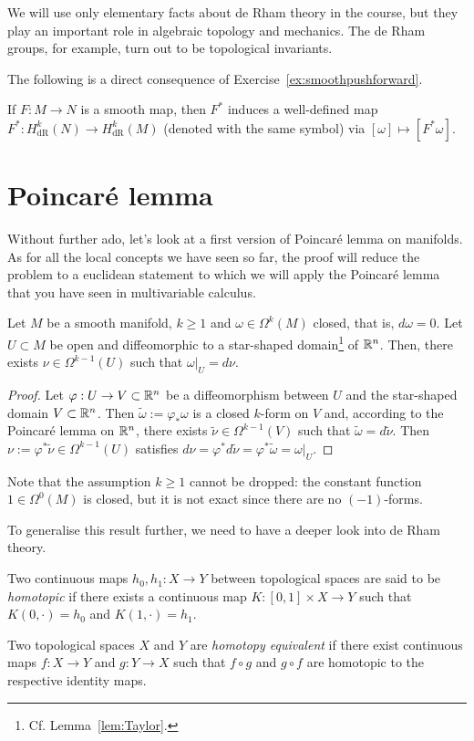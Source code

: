 We will use only elementary facts about de Rham theory in the course, but they play an important role in algebraic topology and mechanics.
The de Rham groups, for example, turn out to be topological invariants.

The following is a direct consequence of Exercise~\ref{ex:smoothpushforward}.

\begin{corollary}
	If $F:M\to N$ is a smooth map, then $F^*$ induces a well-defined map $F^*:H_{\mathrm{dR}}^k(N) \to H_{\mathrm{dR}}^k(M)$ (denoted with the same symbol) via $[\omega]\mapsto[F^*\omega]$.
\end{corollary}

\section{Poincar\'e lemma}
Without further ado, let's look at a first version of Poincar\'e lemma on manifolds.
As for all the local concepts we have seen so far, the proof will reduce the problem to a euclidean statement to which we will apply the Poincar\'e lemma that you have seen in multivariable calculus.

\begin{theorem}
	Let $M$ be a smooth manifold, $k\geq1$ and $\omega\in\Omega^k(M)$ closed, that is, $d\omega = 0$.
	Let $U\subset M$ be open and diffeomorphic to a star-shaped domain\footnote{Cf. Lemma~\ref{lem:Taylor}.} of $\mathbb{R}^n$.
	Then, there exists $\nu\in\Omega^{k-1}(U)$ such that $\omega|_U = d\nu$.
\end{theorem}
\begin{proof}
	Let $\varphi: U \to V\subset\mathbb{R}^n$ be a diffeomorphism between $U$ and the star-shaped domain $V\subset\mathbb{R}^n$.
	Then $\widetilde\omega := \varphi_*\omega$ is a closed $k$-form on $V$ and, according to the Poincar\'e lemma on $\mathbb{R}^n$, there exists $\widetilde \nu \in \Omega^{k-1}(V)$ such that $\widetilde\omega = d\widetilde\nu$.
	Then $\nu := \varphi^*\widetilde\nu\in\Omega^{k-1}(U)$ satisfies $d\nu = \varphi^* d\widetilde\nu = \varphi^*\widetilde\omega = \omega|_U$.
\end{proof}

Note that the assumption $k\geq1$ cannot be dropped: the constant function $1\in\Omega^0(M)$ is closed, but it is not exact since there are no $(-1)$-forms.

To generalise this result further, we need to have a deeper look into de Rham theory.

\begin{definition}
	Two continuous maps $h_0, h_1:X\to Y$ between topological spaces are said to be \emph{homotopic} if there exists a continuous map $K: [0,1]\times X\to Y$ such that $K(0, \cdot) = h_0$ and $K(1,\cdot) = h_1$.

	Two topological spaces $X$ and $Y$ are \emph{homotopy equivalent} if there exist continuous maps $f:X\to Y$ and $g:Y\to X$ such that $f\circ g$ and $g\circ f$ are homotopic to the respective identity maps.
\end{definition}

